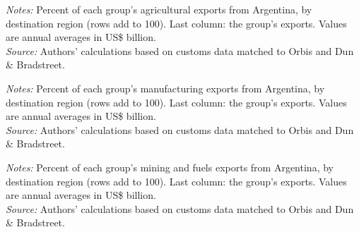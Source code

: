 \documentclass[11pt,a4paper]{article}
\begin{document}
\begin{table}[H]\centering\small%
  \caption{Argentina, Agriculture: Multinational Exports by Parent Region and Destination Region}%
  \label{tab:c_reg_ARG_agro}%
  \par\vspace{3pt}%
  \begin{minipage}{0.95\textwidth}\footnotesize %
  \textit{Notes:} Percent of each group's agricultural exports from Argentina, by destination region (rows add to 100). Last column: the group's exports. Values are annual averages in US\$ billion.\\[3pt]%
  \textit{Source:} Authors' calculations based on customs data matched to Orbis and Dun \& Bradstreet.%
  \end{minipage}%
  \end{table}
\begin{table}[H]\centering\small%
  \caption{Argentina, Manufacturing: Multinational Exports by Parent Region and Destination Region}%
  \label{tab:c_reg_ARG_manufacturing}%
  \par\vspace{3pt}%
  \begin{minipage}{0.95\textwidth}\footnotesize %
  \textit{Notes:} Percent of each group's manufacturing exports from Argentina, by destination region (rows add to 100). Last column: the group's exports. Values are annual averages in US\$ billion.\\[3pt]%
  \textit{Source:} Authors' calculations based on customs data matched to Orbis and Dun \& Bradstreet.%
  \end{minipage}%
  \end{table}
\begin{table}[H]\centering\small%
  \caption{Argentina, Mining and Fuels: Multinational Exports by Parent Region and Destination Region}%
  \label{tab:c_reg_ARG_mining}%
  \par\vspace{3pt}%
  \begin{minipage}{0.95\textwidth}\footnotesize %
  \textit{Notes:} Percent of each group's mining and fuels exports from Argentina, by destination region (rows add to 100). Last column: the group's exports. Values are annual averages in US\$ billion.\\[3pt]%
  \textit{Source:} Authors' calculations based on customs data matched to Orbis and Dun \& Bradstreet.%
  \end{minipage}%
  \end{table}
\end{document}
